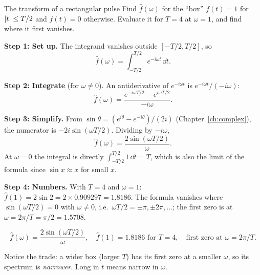 \begin{sample}{The transform of a rectangular pulse}
Find $\hat f(\omega)$ for the ``box'' $f(t)=1$ for $\left\lvert t\right\rvert\le T/2$ and $f(t)=0$ otherwise. Evaluate it for $T=4$ at $\omega=1$, and find where it first vanishes.

\textbf{Step 1: Set up.} The integrand vanishes outside $[-T/2,T/2]$, so
\[\hat f(\omega)=\int_{-T/2}^{T/2}e^{-i\omega t}\,\dd t .\]

\textbf{Step 2: Integrate} (for $\omega\neq0$). An antiderivative of $e^{-i\omega t}$ is $e^{-i\omega t}/(-i\omega)$:
\[\hat f(\omega)=\frac{e^{-i\omega T/2}-e^{i\omega T/2}}{-i\omega}.\]

\textbf{Step 3: Simplify.} From $\sin\theta=(e^{i\theta}-e^{-i\theta})/(2i)$ (Chapter~\ref{ch:complex}), the numerator is $-2i\sin(\omega T/2)$. Dividing by $-i\omega$,
\[\hat f(\omega)=\frac{2\sin(\omega T/2)}{\omega}.\]
At $\omega=0$ the integral is directly $\int_{-T/2}^{T/2}1\,\dd t=T$, which is also the limit of the formula since $\sin x\approx x$ for small $x$.

\textbf{Step 4: Numbers.} With $T=4$ and $\omega=1$: $\hat f(1)=2\sin 2=2\times0.909297=1.8186$. The formula vanishes where $\sin(\omega T/2)=0$ with $\omega\ne0$, i.e.\ $\omega T/2=\pm\pi,\pm2\pi,\dots$; the first zero is at $\omega=2\pi/T=\pi/2=1.5708$.

\[\boxed{\hat f(\omega)=\frac{2\sin(\omega T/2)}{\omega},\quad \hat f(1)=1.8186\text{ for }T=4,\quad\text{first zero at }\omega=2\pi/T.}\]
\end{sample}

Notice the trade: a wider box (larger $T$) has its first zero at a smaller $\omega$, so its spectrum is \emph{narrower}. Long in $t$ means narrow in $\omega$.

